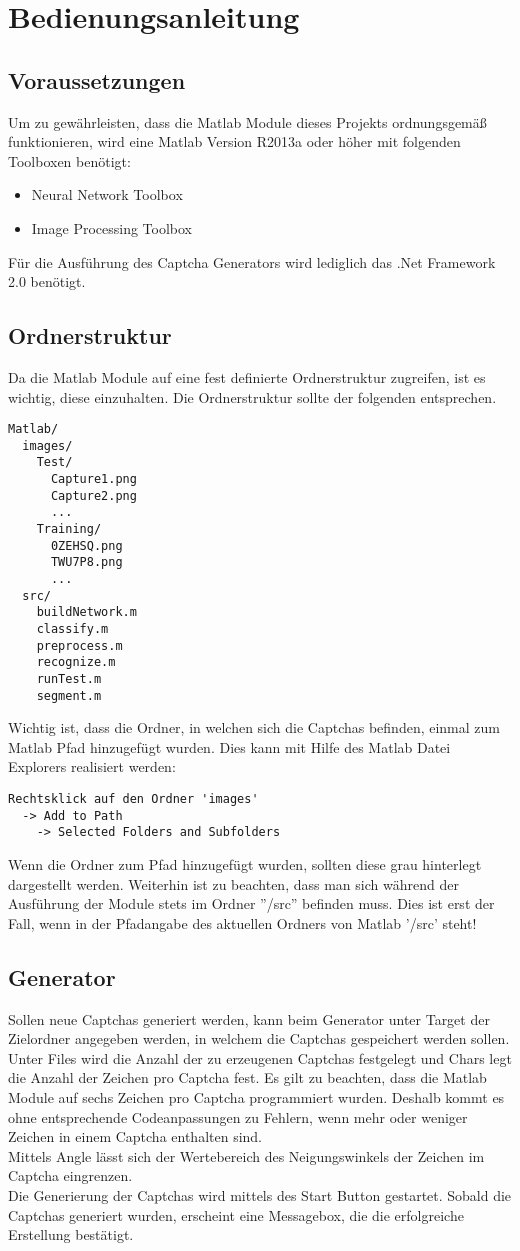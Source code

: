 \section{Bedienungsanleitung}
\subsection{Voraussetzungen}
Um zu gewährleisten, dass die Matlab Module dieses Projekts ordnungsgemäß funktionieren, wird eine Matlab Version R2013a oder höher mit folgenden Toolboxen benötigt:
\begin{itemize}
\item Neural Network Toolbox
\item Image Processing Toolbox
\end{itemize}
Für die Ausführung des Captcha Generators wird lediglich das .Net Framework 2.0 benötigt.

\subsection{Ordnerstruktur}
Da die Matlab Module auf eine fest definierte Ordnerstruktur zugreifen, ist es wichtig, diese einzuhalten. Die Ordnerstruktur sollte der folgenden entsprechen.
\begin{verbatim}
Matlab/
  images/
    Test/
      Capture1.png
      Capture2.png
      ...
    Training/
      0ZEHSQ.png
      TWU7P8.png
      ...
  src/
    buildNetwork.m
    classify.m
    preprocess.m
    recognize.m
    runTest.m
    segment.m
\end{verbatim}
Wichtig ist, dass die Ordner, in welchen sich die Captchas befinden, einmal zum Matlab Pfad hinzugefügt wurden. Dies kann mit Hilfe des Matlab Datei Explorers realisiert werden:
\begin{verbatim}
Rechtsklick auf den Ordner 'images'
  -> Add to Path
    -> Selected Folders and Subfolders
\end{verbatim}
Wenn die Ordner zum Pfad hinzugefügt wurden, sollten diese grau hinterlegt dargestellt werden. Weiterhin ist zu beachten, dass man sich während der Ausführung der Module stets im Ordner ''/src'' befinden muss. Dies ist erst der Fall, wenn in der Pfadangabe des aktuellen Ordners von Matlab '/src' steht!
\subsection{Generator}
Sollen neue Captchas generiert werden, kann beim Generator unter Target der Zielordner angegeben werden, in welchem die Captchas gespeichert werden sollen. Unter Files wird die Anzahl der zu erzeugenen Captchas festgelegt und Chars legt die Anzahl der Zeichen pro Captcha fest. Es gilt zu beachten, dass die Matlab Module auf sechs Zeichen pro Captcha programmiert wurden. Deshalb kommt es ohne entsprechende Codeanpassungen zu Fehlern, wenn mehr oder weniger Zeichen in einem Captcha enthalten sind.\\
Mittels Angle lässt sich der Wertebereich des Neigungswinkels der Zeichen im Captcha eingrenzen.\\
Die Generierung der Captchas wird mittels des Start Button gestartet. Sobald die Captchas generiert wurden, erscheint eine Messagebox, die die erfolgreiche Erstellung bestätigt.

